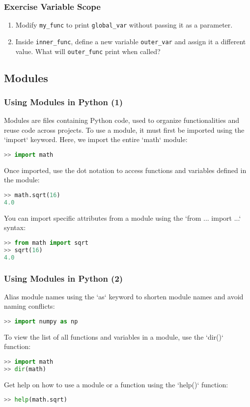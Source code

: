 \begin{frame}
  \frametitle{Exercise Variable Scope}
  
  \begin{enumerate}
    \item Modify \texttt{my\_func} to print \texttt{global\_var} without passing it as a parameter.
    \item Inside \texttt{inner\_func}, define a new variable \texttt{outer\_var} and assign it a different value. What will \texttt{outer\_func} print when called?
  \end{enumerate}
\end{frame}


\subsection*{Modules}
\begin{frame}[fragile]
  \frametitle{Using Modules in Python (1)}
  Modules are files containing Python code, used to organize functionalities and reuse code across projects. To use a module, it must first be imported using the `import` keyword. Here, we import the entire `math` module:
  \begin{lstlisting}[language=Python]
>> import math
  \end{lstlisting}\pause
  Once imported, use the dot notation to access functions and variables defined in the module:
  \begin{lstlisting}[language=Python]
>> math.sqrt(16)
4.0
  \end{lstlisting}\pause
  You can import specific attributes from a module using the `from ... import ...` syntax:
  \begin{lstlisting}[language=Python]
>> from math import sqrt
>> sqrt(16)
4.0
  \end{lstlisting}
\end{frame}

\begin{frame}[fragile]
  \frametitle{Using Modules in Python (2)}
  Alias module names using the `as` keyword to shorten module names and avoid naming conflicts:
  \begin{lstlisting}[language=Python]
>> import numpy as np
  \end{lstlisting}\pause
  To view the list of all functions and variables in a module, use the `dir()` function:
  \begin{lstlisting}[language=Python]
>> import math
>> dir(math)
  \end{lstlisting}\pause
  Get help on how to use a module or a function using the `help()` function:
  \begin{lstlisting}[language=Python]
>> help(math.sqrt)
  \end{lstlisting}
\end{frame}

